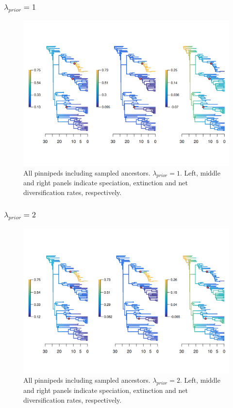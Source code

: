 \documentclass[a4paper, 12pt]{article}
\begin{document}
\subsubsection{$\lambda_{prior} = 1$}

\begin{figure}[H]
  \centering
  \includegraphics[width = \linewidth]{figures/diversification/main-analysis-with-sampled-ancestors/main-analysis-with-sampled-ancestors.png}
  \caption{All pinnipeds including sampled ancestors. $\lambda_{prior} = 1$. Left, middle and right panels indicate speciation, extinction and net diversification rates, respectively.}
  \label{fig-full-1}
\end{figure}

\subsubsection{$\lambda_{prior} = 2$}

\begin{figure}[H]
  \centering
  \includegraphics[width = \linewidth]{figures/diversification/sensitivity-analyses-with-sampled-ancestors/shifts-2/sensitivity-analysis-with-sampled-ancestors-2.png}
  \caption{All pinnipeds including sampled ancestors. $\lambda_{prior} = 2$. Left, middle and right panels indicate speciation, extinction and net diversification rates, respectively.}
  \label{fig-full-2}
\end{figure}
\end{document}
